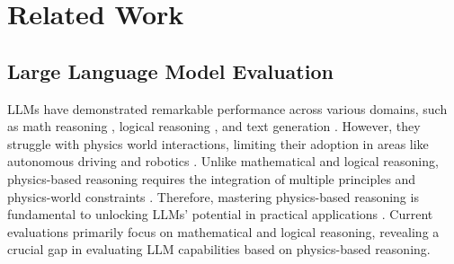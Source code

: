 \section{Related Work}
\subsection{Large Language Model Evaluation}
LLMs have demonstrated remarkable performance across various domains, such as math reasoning \cite{jiang2024forward, li2024snapkv, imani2023mathprompter}, logical reasoning \cite{sun2024determlr, xu-etal-2024-symbol}, and text generation \cite{zhao2024docmath, liang2024controllable}.
However, they struggle with physics world interactions, limiting their adoption in areas like autonomous driving and robotics \cite{gao2024physically}.
Unlike mathematical and logical reasoning, physics-based reasoning requires the integration of multiple principles and physics-world constraints \cite{kline1981mathematics}.
Therefore, mastering physics-based reasoning is fundamental to unlocking LLMs' potential in practical applications \cite{lai2024vision}.
Current evaluations primarily focus on mathematical and logical reasoning, revealing a crucial gap in evaluating LLM capabilities based on physics-based reasoning.
